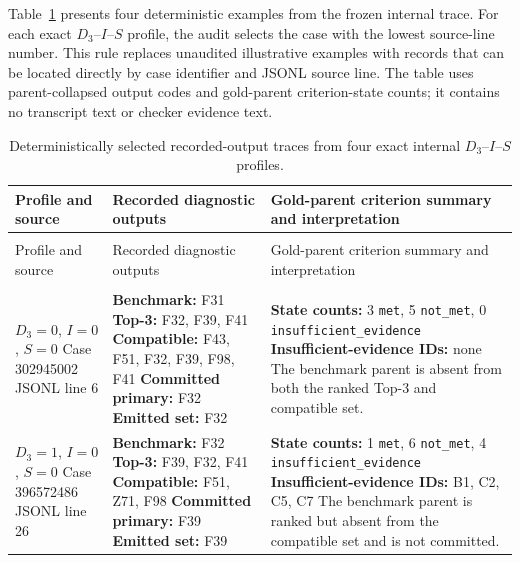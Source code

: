 Table~\ref{tab:audit-trace-examples} presents four deterministic examples from the frozen internal trace. For each exact $D_3$--$I$--$S$ profile, the audit selects the case with the lowest source-line number. This rule replaces unaudited illustrative examples with records that can be located directly by case identifier and JSONL source line. The table uses parent-collapsed output codes and gold-parent criterion-state counts; it contains no transcript text or checker evidence text.

\begingroup
\footnotesize
\setlength{\tabcolsep}{3pt}
\renewcommand{\arraystretch}{1.15}
\begin{longtable}{|>{\raggedright\arraybackslash}p{2.6cm}|>{\raggedright\arraybackslash}p{5.0cm}|>{\raggedright\arraybackslash}p{6.2cm}|}
\caption{Deterministically selected recorded-output traces from four exact internal $D_3$--$I$--$S$ profiles.}
\label{tab:audit-trace-examples}\\
\hline
Profile and source & Recorded diagnostic outputs & Gold-parent criterion summary and interpretation\\
\hline
\endfirsthead
\multicolumn{3}{c}{\tablename~\thetable\ continued}\\
\hline
Profile and source & Recorded diagnostic outputs & Gold-parent criterion summary and interpretation\\
\hline
\endhead
\hline
\multicolumn{3}{r}{Continued on next page}\\
\endfoot
\hline
\endlastfoot

$D_3=0$, $I=0$, $S=0$\newline
Case 302945002\newline
JSONL line 6 &
\textbf{Benchmark:} F31\newline
\textbf{Top-3:} F32, F39, F41\newline
\textbf{Compatible:} F43, F51, F32, F39, F98, F41\newline
\textbf{Committed primary:} F32\newline
\textbf{Emitted set:} F32 &
\textbf{State counts:} 3 \texttt{met}, 5 \texttt{not\_met}, 0 \texttt{insufficient\_evidence}\newline
\textbf{Insufficient-evidence IDs:} none\newline
The benchmark parent is absent from both the ranked Top-3 and compatible set.\\
\hline

$D_3=1$, $I=0$, $S=0$\newline
Case 396572486\newline
JSONL line 26 &
\textbf{Benchmark:} F32\newline
\textbf{Top-3:} F39, F32, F41\newline
\textbf{Compatible:} F51, Z71, F98\newline
\textbf{Committed primary:} F39\newline
\textbf{Emitted set:} F39 &
\textbf{State counts:} 1 \texttt{met}, 6 \texttt{not\_met}, 4 \texttt{insufficient\_evidence}\newline
\textbf{Insufficient-evidence IDs:} B1, C2, C5, C7\newline
The benchmark parent is ranked but absent from the compatible set and is not committed.\\
\hline


\end{longtable}
